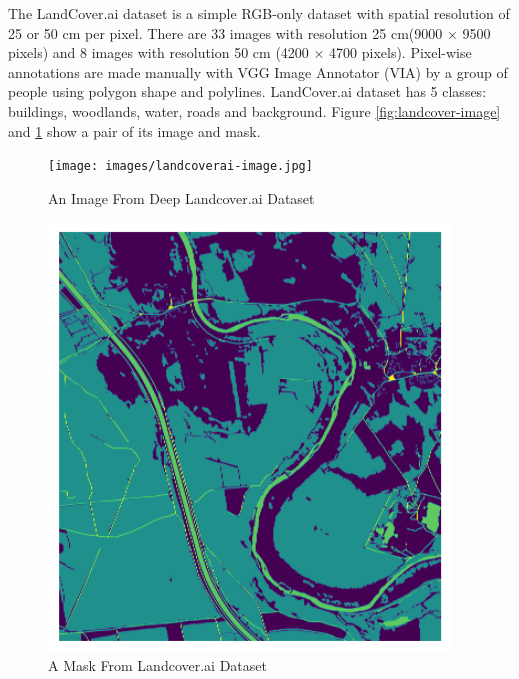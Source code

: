 The LandCover.ai dataset \cite{landcoverai} is a simple RGB-only dataset with spatial resolution of 25 or 50 cm per pixel. There are 33 images with resolution 25 cm(9000 × 9500 pixels) and 8 images with resolution 50 cm (4200 × 4700 pixels). Pixel-wise annotations are made manually with VGG Image Annotator (VIA) by a group of people using polygon shape and polylines. LandCover.ai dataset has 5 classes: buildings, woodlands, water, roads and background. Figure \ref{fig:landcover-image} and \ref{fig:landcover-mask} show a pair of its image and mask.

\FloatBarrier
\begin{figure}[!htb]
    \centering
    \begin{minipage}{0.5\textwidth}
        \centering
        \texttt{[image: images/landcoverai-image.jpg]}
        \caption{An Image From Deep Landcover.ai Dataset \protect\cite{landcoverai}}
        \label{fig:landcover-image}
    \end{minipage}\hfill
    \begin{minipage}{0.5\textwidth}
        \centering
        \includegraphics[width=0.95\textwidth, height=0.35\textheight]{images/landcoverai-mask.png}
\centering
\caption{A Mask From Landcover.ai Dataset \protect\cite{landcoverai}}
\label{fig:landcover-mask}
    \end{minipage}
\end{figure}
\FloatBarrier

